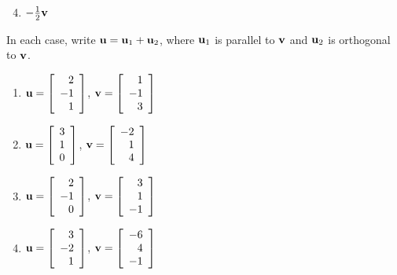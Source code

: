 \begin{multicols}{2}
\begin{ex}
\begin{sol}
\begin{enumerate}[label={\alph*.}]
\setcounter{enumi}{3}
\item  $-\tfrac{1}{2}\textbf{v}$

\end{enumerate}
\end{sol}
\end{ex}

\begin{ex}
In each case, write $\textbf{u} = \textbf{u}_{1} + \textbf{u}_{2}$, where $\textbf{u}_{1}$ is parallel to $\textbf{v}$ and $\textbf{u}_{2}$ is orthogonal to $\textbf{v}$.

\begin{enumerate}[label={\alph*.}]
\item $\textbf{u} = \left[
\begin{array}{r}
2\\
-1\\
1
\end{array}
\right]$, 
$\textbf{v} = \left[
\begin{array}{r}
1\\
-1\\
3
\end{array}
\right]
$

\item $\textbf{u} = \left[
\begin{array}{r}
3\\
1\\
0
\end{array}
\right]$, 
$\textbf{v} = \left[
\begin{array}{r}
-2\\
1\\
4
\end{array}
\right]
$

\item $\textbf{u} = \left[
\begin{array}{r}
2\\
-1\\
0
\end{array}
\right]$, 
$\textbf{v} = \left[
\begin{array}{r}
3\\
1\\
-1
\end{array}
\right]
$

\item $\textbf{u} = \left[
\begin{array}{r}
3\\
-2\\
1
\end{array}
\right]$, 
$\textbf{v} = \left[
\begin{array}{r}
-6\\
4\\
-1
\end{array}
\right]
$


\end{enumerate}
\end{ex}
\end{multicols}
